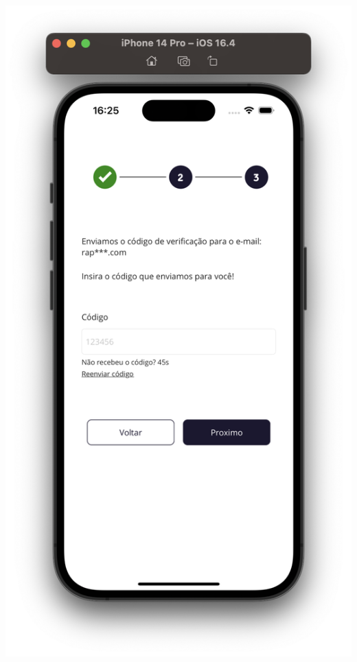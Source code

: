 \begin{center}
\begin{minipage}{0.4\textwidth}
            \label{fig:figura30}
        \end{minipage}%
        \begin{minipage}{0.4\textwidth}
            \centering
            \includegraphics[scale=0.2]{figs/figura31.png}
            \label{fig:figura31}
        \end{minipage}%
    \end{center}

